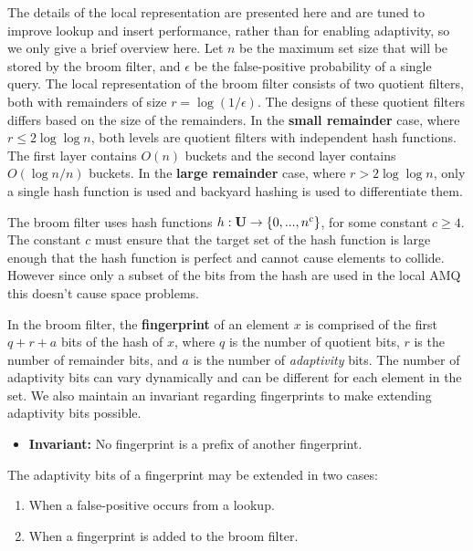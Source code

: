 \documentclass[../paper.tex]{subfiles}
\begin{document}
The details of the local representation are presented here and are tuned to
improve lookup and insert performance, rather than for enabling adaptivity,
so we only give a brief overview here.
Let $n$ be the maximum set size that will be stored by the broom filter, and $\epsilon$
be the false-positive probability of a single query.
The local representation of the broom filter consists of two quotient filters, both
with remainders of size $r=\log(1/\epsilon)$. The designs of these quotient filters
differs based on the size of the remainders. In the \textbf{small remainder} case,
where $r \leq 2 \log \log n$, both levels are quotient filters with independent hash
functions. The first layer contains $O(n)$ buckets and the second layer contains
$O(\log n/n)$ buckets. In the \textbf{large remainder} case, where $r > 2 \log \log n$,
only a single hash function is used and backyard hashing \cite{backyard-hashing} is used
to differentiate them.

The broom filter uses hash functions $h : {\bf U} \rightarrow \{0, ..., n^c\}$, for
some constant $c \geq 4$. The constant $c$ must ensure that the target set of the hash
function is large enough that the hash function is perfect and cannot cause elements
to collide. However since only a subset of the bits from the hash are used in the local
AMQ this doesn't cause space problems.


In the broom filter, the \textbf{fingerprint} of an element $x$ is comprised of the first
$q + r + a$ bits of the hash of $x$, where $q$ is the number of quotient bits, $r$ is the
number of remainder bits, and $a$ is the number of \textit{adaptivity} bits. The number of
adaptivity bits can vary dynamically and can be different for each element in the set. We
also maintain an invariant regarding fingerprints to make extending adaptivity bits possible.

\begin{itemize}
    \item[] \textbf{Invariant:} No fingerprint is a prefix of another fingerprint.
\end{itemize}

The adaptivity bits of a fingerprint may be extended in two cases:

\begin{enumerate}
    \item When a false-positive occurs from a lookup.
    \item When a fingerprint is added to the broom filter.
\end{enumerate}
\end{document}
